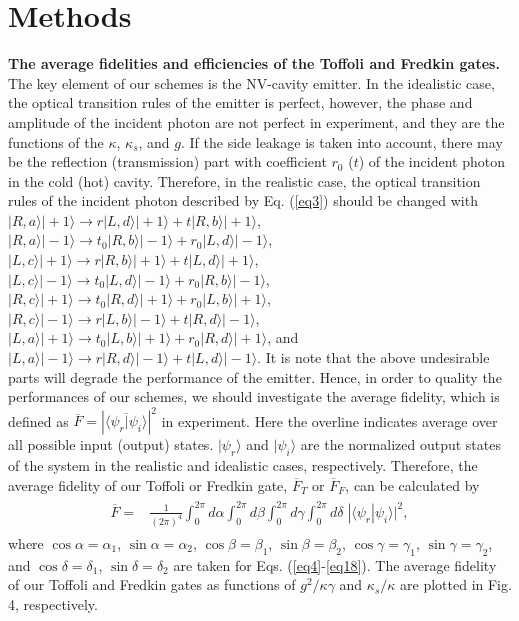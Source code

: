 \documentclass[showpacs,preprintnumbers,showkeys,amsmath,amssymb]{revtex4}%
\begin{document}

\section{Methods}\label{sec4}



{\bf The average fidelities and efficiencies of the Toffoli and Fredkin gates.}
%
%
The key element of our schemes is the NV-cavity emitter. In the idealistic case, the optical transition rules of the emitter is perfect, however, the phase and amplitude of the incident photon are  not perfect in experiment, and they are the functions of the $\kappa$, $\kappa_s$, and $g$. If the side leakage is taken into account, there may be the reflection (transmission) part with coefficient $r_0$ ($t$) of the incident photon in the cold (hot) cavity. Therefore, in the realistic case, the optical transition rules of the incident photon described by Eq. (\ref{eq3}) should be changed with
%
$|R,a\rangle|+1\rangle \rightarrow r|L,d\rangle|+1\rangle + t|R,b\rangle|+1\rangle$,
$|R,a\rangle|-1\rangle \rightarrow t_0|R,b\rangle|-1\rangle + r_0|L,d\rangle|-1\rangle$,
$|L,c\rangle|+1\rangle \rightarrow r|R,b\rangle|+1\rangle + t|L,d\rangle|+1\rangle$,
$|L,c\rangle|-1\rangle \rightarrow t_0|L,d\rangle|-1\rangle + r_0|R,b\rangle|-1\rangle$,
%
%
$|R,c\rangle|+1\rangle \rightarrow t_0|R,d\rangle|+1\rangle + r_0 |L,b\rangle|+1\rangle$,
$|R,c\rangle|-1\rangle \rightarrow r|L,b\rangle|-1\rangle + t|R,d\rangle|-1\rangle$,
%
$|L,a\rangle|+1\rangle \rightarrow t_0|L,b\rangle|+1\rangle + r_0|R,d\rangle|+1\rangle$, and
$|L,a\rangle|-1\rangle \rightarrow r|R,d\rangle|-1\rangle + t|L,d\rangle|-1\rangle$.
 It is note that the above undesirable parts will degrade the performance of the emitter. Hence, in order to quality the performances of our schemes, we should investigate the average fidelity, which is defined as $\overline{F}=|\overline{\langle \psi_r | \psi_i\rangle}|^2$ in experiment. Here the overline indicates average over all possible input (output) states.  $|\psi_r\rangle$ and $|\psi_i\rangle$ are the normalized output states of the system in the realistic and idealistic cases, respectively. Therefore, the average fidelity of our Toffoli or Fredkin gate, $\overline{F}_T$ or $\overline{F}_F$, can be calculated by
\begin{eqnarray}       \label{eq19}
\begin{split}
\overline{F}=&\frac{1}{(2\pi)^4}\int_{0}^{2\pi}d\alpha\int_{0}^{2\pi}d\beta\int_{0}^{2\pi}d\gamma\int_{0}^{2\pi}d\delta \;   |\langle\psi_{r}|\psi_{i} \rangle|^2,
\end{split}
\end{eqnarray}
where $\cos\alpha=\alpha_1$,  $\sin\alpha=\alpha_2$,
$\cos\beta=\beta_1$,  $\sin\beta=\beta_2$,
$\cos\gamma=\gamma_1$,  $\sin\gamma=\gamma_2$, and
$\cos\delta=\delta_1$,  $\sin\delta=\delta_2$ are taken for Eqs. (\ref{eq4}-\ref{eq18}). The average fidelity of our Toffoli and Fredkin gates as functions of $g^2/\kappa\gamma$ and $\kappa_s/\kappa$ are plotted in Fig. 4, respectively.
\end{document}
